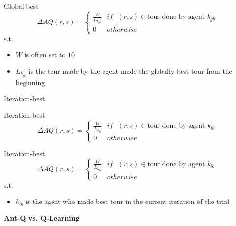 \documentclass[aspectratio=169,xcolor=dvipsnames]{beamer}
\begin{document}
\begin{frame}{Global-best}
    \begin{equation}
        \Delta AQ(r,s )= \begin{cases}\frac{W}{L_{k_{gb}}} &if\text{ }(r, s) \in \text {tour done by agent }k_{gb}\\0 &otherwise\end{cases}
    \end{equation}
    s.t.\\
    \begin{itemize}
        \item $W$ is often set to $10$
        \item $L_{k_{gb}}$ is the tour made by the agent made the globally best tour from the beginning
    \end{itemize}
\end{frame}

\begin{frame}{Iteration-best}
    
\end{frame}

\begin{frame}{Iteration-best}
    \begin{equation*}
        \Delta AQ(r, s) = \begin{cases}\frac{W}{L_{k_{ib}}} &if \text{ } (r,s) \in \text{tour done by agent }k_{ib}\\0 &otherwise\end{cases}
    \end{equation*}
\end{frame}

\begin{frame}{Iteration-best}
    \begin{equation*}
        \Delta AQ(r, s) = \begin{cases}\frac{W}{L_{k_{ib}}} &if \text{ } (r,s) \in \text{tour done by agent }k_{ib}\\0 &otherwise\end{cases}
    \end{equation*}
    s.t.\\
    \begin{itemize}
        \item $k_{ib}$ is the agent who made best tour in the current iteration of the trial
    \end{itemize}
\end{frame}

\begin{frame}
    \huge\centering\textbf{Ant-Q vs. Q-Learning}
\end{frame}
\end{document}
